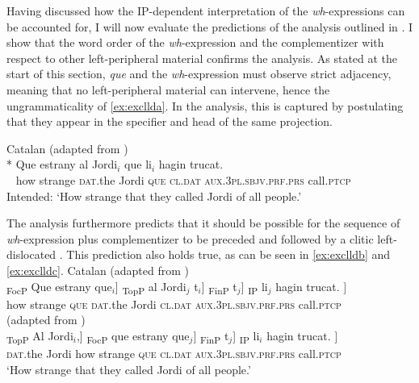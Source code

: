 Having discussed how the IP-dependent interpretation of the \textit{wh}-expressions can be accounted for,  I will now  evaluate the predictions of the analysis outlined in . I show that the word order of the \textit{wh}-expression and the complementizer with respect to other left-peripheral material confirms the analysis. As stated at the start of this section, \emph{que} and the \textit{wh}-expression must observe strict adjacency, meaning that no left-peripheral material can intervene, hence the ungrammaticality of \eqref{ex:excllda}. In the analysis, this is captured by postulating that they appear in the specifier and head of the same projection.

\ea\label{ex:excllda}
   Catalan (adapted from \citealt[48: ex 95a]{Kocher2017a})\\
    \gll  
	* Que estrany  al Jordi$_i$ que li$_i$ hagin trucat. \\
	~ how  strange \textsc{dat}.the Jordi  \textsc{que} \textsc{cl.dat} \textsc{aux.3pl.sbjv.prf.prs} call.\textsc{ptcp}\\
 \glt Intended: `How strange that they called Jordi of all people.'
\z 


The analysis furthermore predicts that it should be possible for the sequence of  \textit{wh}-expression plus complementizer to be preceded and followed by a clitic left-dislocated . This prediction also holds true, as can be seen in  \eqref{ex:exclldb} and \eqref{ex:exclldc}.
\ea Catalan 
\ea  \label{ex:exclldb}  
		 (adapted from \citealt[48: ex 95b]{Kocher2017a})\\
\gll {\ob}\textsubscript{FocP} Que estrany que$_i$] {\ob}\textsubscript{TopP} al Jordi$_j$ t$_i$] {\ob}\textsubscript{FinP} t$_j$] {\ob}\textsubscript{IP} li$_j$ hagin trucat. $]$\\
			{} how  strange  \textsc{que} {} \textsc{dat}.the Jordi {} {} {} {} \textsc{cl.dat} \textsc{aux.3pl.sbjv.prf.prs} call.\textsc{ptcp} \\

	
		\ex \label{ex:exclldc} (adapted from \citealt[48: ex 95c]{Kocher2017a}) \\
		\gll  {\ob}\textsubscript{TopP} Al Jordi$_i$,] {\ob}\textsubscript{FocP} que estrany que$_j$]  {\ob}\textsubscript{FinP} t$_j$] {\ob}\textsubscript{IP} li$_i$ hagin trucat. $]$ \\
		{} \textsc{dat}.the Jordi {} how  strange  \textsc{que}  {} {} {} \textsc{cl.dat} \textsc{aux.3pl.sbjv.prf.prs} call.\textsc{ptcp}\\ 
		\glt `How strange that they called Jordi of all people.' 
	\z
\z

